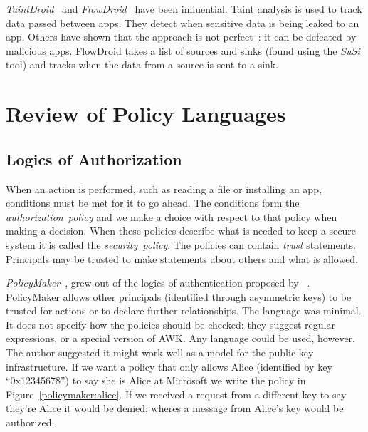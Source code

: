 \documentclass[a4paper]{article}
\begin{document}
\emph{TaintDroid}~\cite{Enck:2010uw} and \emph{FlowDroid}~\cite{Fritz:2013vi}
have been influential.  Taint analysis is used to track data passed between
apps. They detect when sensitive data is being leaked to an app. Others have
shown that the approach is not perfect~\cite{Sarwar:2013ta}: it can be defeated
by malicious apps.  FlowDroid takes a list of sources and sinks (found using the
\emph{SuSi} tool\cite{Rasthofer:2014uq}) and tracks when the data from a source
is sent to a sink.  

\section{Review of Policy Languages}
\label{sec:authlang}

\subsection{Logics of Authorization}

When an action is performed, such as reading a file or installing an app,
conditions must be met for it to go ahead. The conditions form the
\emph{authorization~policy} and we make a choice with respect to that policy
when making a decision. When these policies describe what
is needed to keep a secure system it is called the \emph{security~policy}.  The
policies can contain \emph{trust} statements. Principals may be trusted to make
statements about others and what is allowed.

\emph{PolicyMaker}~\cite{Blaze:dj}, grew out of the logics of authentication
proposed by
\citeauthor*{Wobber:1994dh}~\cite{Lampson:1992jg,Wobber:1994dh}.
PolicyMaker allows other principals (identified through asymmetric keys) to be
trusted for actions or to declare further relationships. The language was
minimal. It does not specify how the policies should be checked: they suggest
regular expressions, or  a special version of AWK. Any language could be
used, however.  The author suggested it might work well as a model for the
public-key infrastructure. If we want a policy that only allows Alice
(identified by key ``\textsf{0x12345678}'') to say she is Alice at Microsoft we
write the policy in Figure~\ref{policymaker:alice}.  If we received a request
from a different key to say they're Alice it would be denied; wheres a message
from Alice's key would be authorized.
\end{document}
